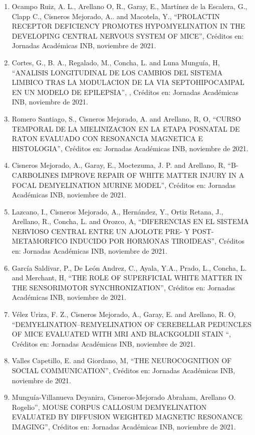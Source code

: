 \begin{enumerate}
\item Ocampo Ruiz, A. L., Arellano O, R., Garay, E., Martínez de la Escalera, G., Clapp C., Cisneros Mejorado, A.. and Macotela, Y., 
“PROLACTIN 
RECEPTOR DEFICIENCY PROMOTES HYPOMYELINATION IN THE DEVELOPING CENTRAL NERVOUS SYSTEM OF MICE”, Créditos en: Jornadas Académicas INB, 
noviembre de 2021.

\item Cortes, G., B. A., Regalado, M., Concha, L. and Luna Munguía, H, “ANALISIS LONGITUDINAL DE LOS CAMBIOS DEL SISTEMA LIMBICO TRAS LA 
MODULACION DE LA VIA SEPTOHIPOCAMPAL EN UN MODELO DE EPILEPSIA”, , Créditos en: Jornadas Académicas INB, noviembre de 2021.

\item Romero Santiago, S., Cisneros Mejorado, A. and Arellano, R, O, “CURSO TEMPORAL DE LA MIELINIZACION EN LA ETAPA POSNATAL DE RATON 
EVALUADO 
CON RESONANCIA MAGNETICA E HISTOLOGIA”, Créditos en: Jornadas Académicas INB, noviembre de 2021.

\item Cisneros Mejorado, A., Garay, E., Moctezuma, J. P. and Arellano, R, “B-CARBOLINES IMPROVE REPAIR OF WHITE MATTER INJURY IN A FOCAL 
DEMYELINATION MURINE MODEL”, Créditos en: Jornadas Académicas INB, noviembre de 2021.

\item Lazcano, I., Cisneros Mejorado, A., Hernández, Y., Ortiz Retana, J., Arellano, R., Concha, L. and Orozco, A, “DIFERENCIAS EN EL 
SISTEMA 
NERVIOSO CENTRAL ENTRE UN AJOLOTE PRE- Y POST-METAMORFICO INDUCIDO POR HORMONAS TIROIDEAS”, Créditos en: Jornadas Académicas INB, noviembre 
de 2021.

\item García Saldivar, P., De León Andrez, C., Ayala, Y.A., Prado, L., Concha, L. and Merchant, H, “THE ROLE OF SUPERFICIAL WHITE MATTER IN 
THE 
SENSORIMOTOR SYNCHRONIZATION”, Créditos en: Jornadas Académicas INB, noviembre de 2021.

\item Vélez Uriza, F. Z., Cisneros Mejorado, A., Garay, E. and Arellano, R. O, “DEMYELINATION–REMYELINATION OF CEREBELLAR PEDUNCLES OF MICE 
EVALUATED WITH MRI AND BLACKGOLDII STAIN “, Créditos en: Jornadas Académicas INB, noviembre de 2021.

\item Valles Capetillo, E. and Giordano, M, “THE NEUROCOGNITION OF SOCIAL COMMUNICATION”, Créditos en: Jornadas Académicas INB, noviembre de 
2021.

\item Munguía-Villanueva Deyanira, Cisneros-Mejorado Abraham, Arellano O. Rogelio”, MOUSE CORPUS CALLOSUM DEMYELINATION EVALUATED BY 
DIFFUSION 
WEIGHTED MAGNETIC RESONANCE IMAGING”, Créditos en: Jornadas Académicas INB, noviembre de 2021.


\end{enumerate}
